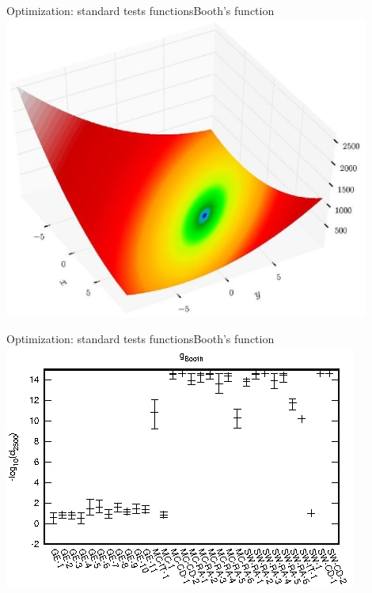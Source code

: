 \documentclass[10pt]{beamer}
\begin{document}
\begin{frame}{Optimization: standard tests functions}{Booth's function}
	\includegraphics[width=0.9\textwidth]{booth-function.eps}
\end{frame}

\begin{frame}{Optimization: standard tests functions}{Booth's function}
	\includegraphics[width=\textwidth]{Booth-e.eps}
\end{frame}
\end{document}
